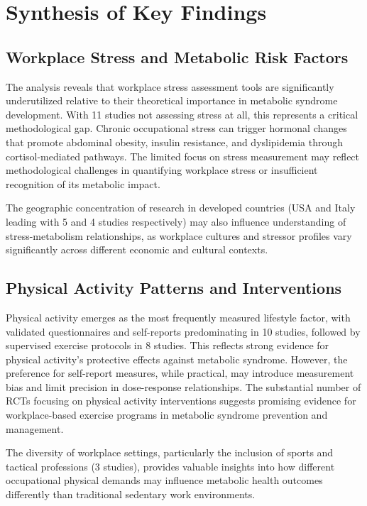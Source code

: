 \section{Synthesis of Key Findings}
\subsection{Workplace Stress and Metabolic Risk Factors}
The analysis reveals that workplace stress assessment tools are significantly underutilized relative to their theoretical importance in metabolic syndrome development. With 11 studies not assessing stress at all, this represents a critical methodological gap. Chronic occupational stress can trigger hormonal changes that promote abdominal obesity, insulin resistance, and dyslipidemia through cortisol-mediated pathways. The limited focus on stress measurement may reflect methodological challenges in quantifying workplace stress or insufficient recognition of its metabolic impact.\par
The geographic concentration of research in developed countries (USA and Italy leading with 5 and 4 studies respectively) may also influence understanding of stress-metabolism relationships, as workplace cultures and stressor profiles vary significantly across different economic and cultural contexts.
\subsection{Physical Activity Patterns and Interventions}
Physical activity emerges as the most frequently measured lifestyle factor, with validated questionnaires and self-reports predominating in 10 studies, followed by supervised exercise protocols in 8 studies. This reflects strong evidence for physical activity's protective effects against metabolic syndrome. However, the preference for self-report measures, while practical, may introduce measurement bias and limit precision in dose-response relationships. The substantial number of RCTs focusing on physical activity interventions suggests promising evidence for workplace-based exercise programs in metabolic syndrome prevention and management.\par
The diversity of workplace settings, particularly the inclusion of sports and tactical professions (3 studies), provides valuable insights into how different occupational physical demands may influence metabolic health outcomes differently than traditional sedentary work environments.
